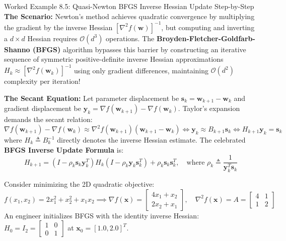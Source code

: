 \begin{examplebox}[breakable]{Worked Example 8.5: Quasi-Newton BFGS Inverse Hessian Update Step-by-Step}
\label{ex:w08_bfgs_update}
\textbf{The Scenario:}
Newton's method achieves quadratic convergence by multiplying the gradient by the inverse Hessian $[\nabla^2 f(\mathbf{w})]^{-1}$, but computing and inverting a $d \times d$ Hessian requires $\mathcal{O}(d^3)$ operations.
The \textbf{Broyden-Fletcher-Goldfarb-Shanno (BFGS)} algorithm bypasses this barrier by constructing an iterative sequence of symmetric positive-definite inverse Hessian approximations $H_k \approx [\nabla^2 f(\mathbf{w}_k)]^{-1}$ using only gradient differences, maintaining $\mathcal{O}(d^2)$ complexity per iteration!

\textbf{The Secant Equation:}
Let parameter displacement be $\mathbf{s}_k = \mathbf{w}_{k+1} - \mathbf{w}_k$ and gradient displacement be $\mathbf{y}_k = \nabla f(\mathbf{w}_{k+1}) - \nabla f(\mathbf{w}_k)$.
Taylor's expansion demands the secant relation:
\begin{equation*}
\nabla f(\mathbf{w}_{k+1}) - \nabla f(\mathbf{w}_k) \approx \nabla^2 f(\mathbf{w}_{k+1}) (\mathbf{w}_{k+1} - \mathbf{w}_k) \iff \mathbf{y}_k \approx B_{k+1} \mathbf{s}_k \iff H_{k+1} \mathbf{y}_k = \mathbf{s}_k
\end{equation*}
where $H_k \triangleq B_k^{-1}$ directly denotes the inverse Hessian estimate.
The celebrated \textbf{BFGS Inverse Update Formula} is:
\begin{equation*}
H_{k+1} = \left( I - \rho_k \mathbf{s}_k \mathbf{y}_k^T \right) H_k \left( I - \rho_k \mathbf{y}_k \mathbf{s}_k^T \right) + \rho_k \mathbf{s}_k \mathbf{s}_k^T, \quad \text{where } \rho_k \triangleq \frac{1}{\mathbf{y}_k^T \mathbf{s}_k}
\end{equation*}

Consider minimizing the 2D quadratic objective:
\begin{equation*}
f(x_1, x_2) = 2x_1^2 + x_2^2 + x_1 x_2 \implies \nabla f(\mathbf{x}) = \begin{bmatrix} 4x_1 + x_2 \\ 2x_2 + x_1 \end{bmatrix}, \quad \nabla^2 f(\mathbf{x}) = A = \begin{bmatrix} 4 & 1 \\ 1 & 2 \end{bmatrix}
\end{equation*}
An engineer initializes BFGS with the identity inverse Hessian: $H_0 = I_2 = \begin{bmatrix} 1 & 0 \\ 0 & 1 \end{bmatrix}$ at $\mathbf{x}_0 = [1.0, 2.0]^T$.


\end{examplebox}
